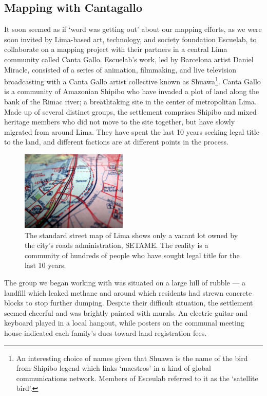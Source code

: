 \documentclass[11pt,oneside,notitlepage]{report}
\begin{document}
\subsection{Mapping with Cantagallo}

It soon seemed as if `word was getting out' about our mapping efforts, as we were soon invited by Lima-based art, technology, and society foundation Escuelab, to collaborate on a mapping project with their partners in a central Lima community called Canta Gallo. Escuelab's work, led by Barcelona artist Daniel Miracle, consisted of a series of animation, filmmaking, and live television broadcasting with a Canta Gallo artist collective known as Shuawa\footnote{An interesting choice of names given that Shuawa is the name of the bird from Shipibo legend which links `maestros' in a kind of global communications network. Members of Esceulab referred to it as the `satellite bird'.}. Canta Gallo is a community of Amazonian Shipibo who have invaded a plot of land along the bank of the Rimac river; a breathtaking site in the center of metropolitan Lima. Made up of several distinct groups, the settlement comprises Shipibo and mixed heritage members who did not move to the site together, but have slowly migrated from around Lima. They have spent the last 10 years seeking legal title to the land, and different factions are at different points in the process. 

\begin{figure}
	\begin{flushright}
		\includegraphics[width=0.45\textwidth]{images/canta-gallo-setame.jpg}
		\caption{The standard street map of Lima shows only a vacant lot owned by the city's roads administration, SETAME. The reality is a community of hundreds of people who have sought legal title for the last 10 years.} 
	\end{flushright}
\end{figure}

The group we began working with was situated on a large hill of rubble --- a landfill which leaked methane and around which residents had strewn concrete blocks to stop further dumping. Despite their difficult situation, the settlement seemed cheerful and was brightly painted with murals. An electric guitar and keyboard played in a local hangout, while posters on the communal meeting house indicated each family's dues toward land registration fees. 
\end{document}
